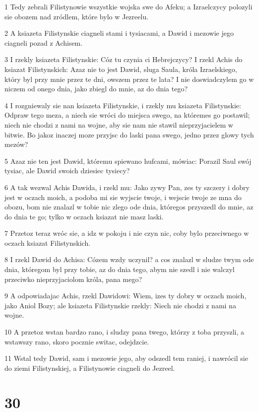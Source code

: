 \par 1 Tedy zebrali Filistynowie wszystkie wojska swe do Afeku; a Izraelczycy polozyli sie obozem nad zródlem, które bylo w Jezreelu.
\par 2 A ksiazeta Filistynskie ciagneli stami i tysiacami, a Dawid i mezowie jego ciagneli pozad z Achisem.
\par 3 I rzekly ksiazeta Filistynskie: Cóz tu czynia ci Hebrejczycy? I rzekl Achis do ksiazat Filistynskich: Azaz nie to jest Dawid, sluga Saula, króla Izraelskiego, który byl przy mnie przez te dni, owszem przez te lata? I nie doswiadczylem go w niczem od onego dnia, jako zbiegl do mnie, az do dnia tego?
\par 4 I rozgniewaly sie nan ksiazeta Filistynskie, i rzekly mu ksiazeta Filistynskie: Odpraw tego meza, a niech sie wróci do miejsca swego, na któremes go postawil; niech nie chodzi z nami na wojne, aby sie nam nie stawil nieprzyjacielem w bitwie. Bo jakoz inaczej moze przyjsc do laski pana swego, jedno przez glowy tych mezów?
\par 5 Azaz nie ten jest Dawid, któremu spiewano hufcami, mówiac: Porazil Saul swój tysiac, ale Dawid swoich dziesiec tysiecy?
\par 6 A tak wezwal Achis Dawida, i rzekl mu: Jako zywy Pan, zes ty szczery i dobry jest w oczach moich, a podoba mi sie wyjscie twoje, i wejscie twoje ze mna do obozu, bom nie znalazl w tobie nic zlego ode dnia, któregos przyszedl do mnie, az do dnia te go; tylko w oczach ksiazat nie masz laski.
\par 7 Przetoz teraz wróc sie, a idz w pokoju i nie czyn nic, coby bylo przeciwnego w oczach ksiazat Filistynskich.
\par 8 I rzekl Dawid do Achisa: Cózem wzdy uczynil? a cos znalazl w sludze twym ode dnia, któregom byl przy tobie, az do dnia tego, abym nie szedl i nie walczyl przeciwko nieprzyjaciolom króla, pana mego?
\par 9 A odpowiadajac Achis, rzekl Dawidowi: Wiem, izes ty dobry w oczach moich, jako Aniol Bozy; ale ksiazeta Filistynskie rzekly: Niech nie chodzi z nami na wojne.
\par 10 A przetoz wstan bardzo rano, i sludzy pana twego, którzy z toba przyszli, a wstawszy rano, skoro pocznie switac, odejdzcie.
\par 11 Wstal tedy Dawid, sam i mezowie jego, aby odszedl tem raniej, i nawrócil sie do ziemi Filistynskiej, a Filistynowie ciagneli do Jezreel.

\chapter{30}

